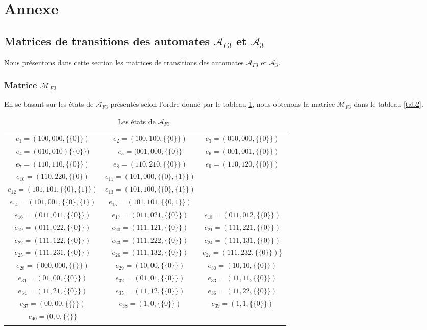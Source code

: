 \chapter*{Annexe}
 \begin{spacing}{0.30}
\section*{Matrices de transitions des automates $\mathcal{A}_{F3}$ et $\mathcal{A}_{3}$}
 \end{spacing}
Nous présentons dans cette section les matrices de transitions des automates $\mathcal{A}_{F3}$ et  $\mathcal{A}_{3}$.
\begin{spacing}{0.30} 
\subsection*{Matrice $\mathcal{M}_{F3}$}
 \end{spacing}
En se basant sur les états de $\mathcal{A}_{F3}$ présentés selon l'ordre donné par le tableau \ref{tab1}, nous obtenons la matrice $\mathcal{M}_{F3}$ dans le tableau \ref{tab2}.
\small
\begin{longtable}{|c|c|c|} 
\hline
$e_{1}=(100,000,\{\{0\}\})$&
$e_{2}=(100,100,\{\{0\}\})$&
$e_{3}=(010,000,\{\{0\}\})$\\
$e_{4}=(010,010)\{\{0\}\})$&
$e_{5}=(001,000,\{\{0\}\}$&
$e_{6}=(001,001,\{\{0\}\})$\\
$e_{7}=(110,110,\{\{0\}\})$&
$e_{8}=(110,210,\{\{0\}\})$&
$e_{9}=(110,120,\{\{0\}\})$\\
$e_{10}=(110,220,\{\{0\})$&
$e_{11}=(101,000,\{\{0\},\{1\}\})$& \\
$e_{12}=(101,101,\{\{0\},\{1\}\})$ &
$e_{13}=(101,100,\{\{0\},\{1\}\})$& \\
$e_{14}=(101,001,\{\{0\},\{1\})$&
$e_{15}=(101,101,\{\{0,1\}\})$ &\\
$e_{16}=(011,011,\{\{0\}\})$&
$e_{17}=(011,021,\{\{0\}\})$&
$e_{18}=(011,012,\{\{0\}\})$\\
$e_{19}=(011,022,\{\{0\}\})$&
$e_{20}=(111,121,\{\{0\}\})$&
$e_{21}=(111,221,\{\{0\}\})$\\
$e_{22}=(111,122,\{\{0\}\})$&
$e_{23}=(111,222,\{\{0\}\})$&
$e_{24}=(111,131,\{\{0\}\})$\\
$e_{25}=(111,231,\{\{0\}\})$&
$e_{26}=(111,132,\{\{0\}\})$&
$e_{27}=(111,232,\{\{0\}\})$\}\\
$e_{28}=(000,000,\{\{ \}\})$&
$e_{29}=(10,00,\{\{0\}\})$&
$e_{30}=(10,10,\{\{0\}\})$\\
$e_{31}=(01,00,\{\{0\}\})$&
$e_{32}=(01,01,\{\{0\}\})$&
$e_{33}=(11,11,\{\{0\}\})$\\
$e_{34}=(11,21,\{\{0\}\})$&
$e_{35}=(11,12,\{\{0\}\})$&
$e_{36}=(11,22,\{\{0\}\})$\\
$e_{37}=(00,00,\{\{ \}\})$&
$e_{38}=(1,0,\{\{0\}\})$ & 
$e_{39}=(1,1,\{\{0\}\})$\\
$e_{40}=(0,0,\{\{ \}\}$ & &\\
\hline
\caption{\label{tab1} Les états de $\mathcal{A}_{F3}$.}
\end{longtable}
